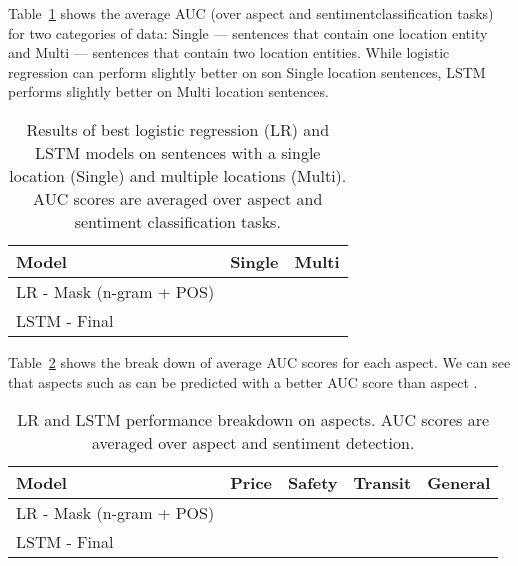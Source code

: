 \documentclass[11pt]{article}
\begin{document}
    Table~\ref{tab:results_categories} shows the average AUC (over aspect and sentimentclassification tasks) for two categories of data: Single --- sentences that contain one location entity and Multi --- sentences that contain two location entities. While logistic regression can perform slightly better on son Single location sentences, LSTM performs slightly better on Multi location sentences. 
    \begin{table}[ht]
        \centering
        \begin{tabular}{l| r | r}
Model                       &           Single      &           Multi               \\
            \hline
            LR - Mask (n-gram + POS)           &       &               \\
            \hline      
            LSTM - Final                &                &                        \\
        \end{tabular}
        \caption{Results of best logistic regression (LR) and LSTM models on sentences with a single location (Single) and multiple locations (Multi). AUC scores are averaged over aspect and sentiment classification tasks.}
        \label{tab:results_categories}
    \end{table}
    
    Table~\ref{tab:results_aspects} shows the break down of average AUC scores for each aspect. We can see that aspects such as  can be predicted with a better AUC score than aspect .  
    \begin{table}[ht]
        \centering
        \begin{tabular}{l| r | r | r | r }
            Model               &       Price           &   Safety              &   Transit             &           General         \\
            \hline
            LR - Mask (n-gram + POS)   &       &       &       &                    \\
            \hline
            LSTM - Final        &                &                &                &            \\
        \end{tabular}
        \caption{LR and LSTM performance breakdown on aspects. AUC scores are averaged over aspect and sentiment detection.}
        \label{tab:results_aspects}
    \end{table}
    
\end{document}
